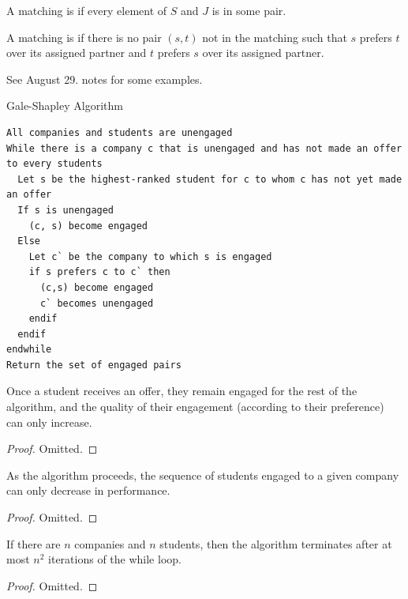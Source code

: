 \documentclass[12pt]{scrartcl}
\begin{document}
\begin{definition}
  A matching is  if every element of $S$ and $J$ is in some pair. 
\end{definition}

\begin{definition}
  A matching is  if there is no pair $(s,t)$ not in the matching such that 
  $s$ prefers $t$ over its assigned partner and $t$ prefers $s$ over its assigned partner. 
\end{definition}

\begin{example}
  See August 29. notes for some examples. 
\end{example}

\begin{definition}
  Gale-Shapley Algorithm

\begin{lstlisting}
All companies and students are unengaged
While there is a company c that is unengaged and has not made an offer to every students
  Let s be the highest-ranked student for c to whom c has not yet made an offer
  If s is unengaged
    (c, s) become engaged
  Else
    Let c` be the company to which s is engaged
    if s prefers c to c` then 
      (c,s) become engaged
      c` becomes unengaged
    endif
  endif
endwhile
Return the set of engaged pairs
\end{lstlisting}
\end{definition}

\begin{lemma}
  Once a student receives an offer, they remain engaged for the rest of the algorithm, and the 
  quality of their engagement (according to their preference) can only increase. 
  \begin{proof}
    Omitted.
  \end{proof}
\end{lemma}

\begin{lemma}
  As the algorithm proceeds, the sequence of students engaged to a given company can only decrease 
  in performance. 
  \begin{proof}
    Omitted. 
  \end{proof}
\end{lemma}

\begin{lemma}
  If there are $n$ companies and $n$ students, then the algorithm terminates after at most 
  $n^2$ iterations of the while loop. 
  \begin{proof}
    Omitted. 
  \end{proof}
\end{lemma}
\end{document}
